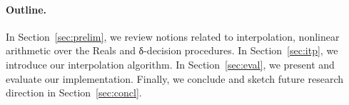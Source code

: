 \paragraph{Outline.}
In Section~\ref{sec:prelim}, we review notions related to interpolation, nonlinear arithmetic over the Reals and δ-decision procedures.
In Section~\ref{sec:itp}, we introduce our interpolation algorithm.
In Section~\ref{sec:eval}, we present and evaluate our implementation.
Finally, we conclude and sketch future research direction in Section~\ref{sec:concl}.



